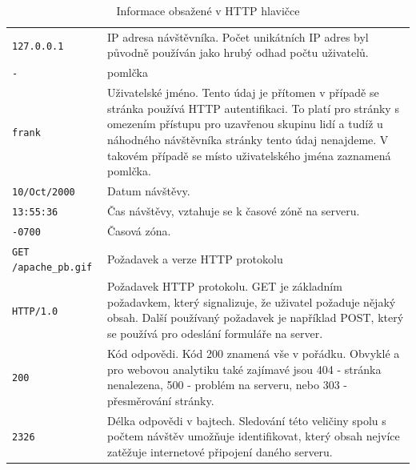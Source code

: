 \documentclass[bc,male,java,dept456]{diploma}						%
\begin{document}
\begin{table}
	\centering      
	\begin{tabular}{ lp{9cm} }
  \verb!127.0.0.1! & IP adresa návštěvníka. Počet unikátních IP adres byl původně používán jako hrubý odhad počtu uživatelů. \\ \bigskip
  \verb!-! & pomlčka \\ \bigskip
  \verb!frank! & Uživatelské jméno. Tento údaj je přítomen v případě se stránka používá HTTP autentifikaci. To platí pro stránky s omezením přístupu pro uzavřenou skupinu lidí a tudíž u náhodného návštěvníka stránky tento údaj nenajdeme. V takovém případě se místo uživatelského jména zaznamená pomlčka. \\ \bigskip
  \verb!10/Oct/2000! & Datum návštěvy. \\ \bigskip
  \verb!13:55:36! & Čas návštěvy, vztahuje se k časové zóně na serveru. \\ \bigskip  
  
  \verb!-0700! & Časová zóna. \\ \bigskip
  \verb!GET /apache_pb.gif! & Požadavek a verze HTTP protokolu \\ \bigskip
  \verb!HTTP/1.0! & Požadavek HTTP protokolu. GET je základním požadavkem, který signalizuje, že uživatel požaduje nějaký obsah. Další používaný požadavek je například POST, který se používá pro odeslání formuláře na server.  \\ \bigskip
  
  \verb!200! & Kód odpovědi. Kód 200 znamená vše v pořádku. Obvyklé a pro webovou analytiku také zajímavé jsou 404 - stránka nenalezena, 500 - problém na serveru, nebo 303 - přesměrování stránky. \\ \bigskip
  \verb!2326! & Délka odpovědi v bajtech. Sledování této veličiny spolu s počtem návštěv umožňuje identifikovat, který obsah nejvíce zatěžuje internetové připojení daného serveru.
	\end{tabular}
	\caption{Informace obsažené v HTTP hlavičce}
	\label{tab:http_log_info}
\end{table}
\end{document}
